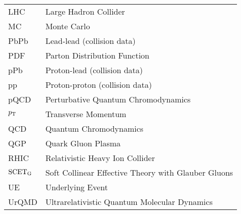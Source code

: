 \begin{table}[htbp]
\begin{tabular}{l l}
LHC & Large Hadron Collider \\

MC & Monte Carlo\\






PbPb & Lead-lead (collision data)\\

PDF & Parton Distribution Function\\

pPb & Proton-lead (collision data)\\

pp & Proton-proton (collision data)\\

pQCD & Perturbative Quantum Chromodynamics\\

$p_{\rm T}$ & Transverse Momentum\\

QCD & Quantum Chromodynamics\\

QGP  &  Quark Gluon Plasma \\

RHIC & Relativistic Heavy Ion Collider\\

$\rm SCET_{G}$ & Soft Collinear Effective Theory with Glauber Gluons\\

UE & Underlying Event \\

UrQMD & Ultrarelativistic Quantum Molecular Dynamics \\

\end{tabular}

\end{table}